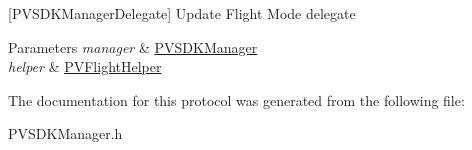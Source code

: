 \mbox{[}P\+V\+S\+D\+K\+Manager\+Delegate\mbox{]} Update Flight Mode delegate


\begin{DoxyParams}{Parameters}
{\em manager} & \hyperlink{interface_p_v_s_d_k_manager}{P\+V\+S\+D\+K\+Manager} \\
\hline
{\em helper} & \hyperlink{interface_p_v_flight_helper}{P\+V\+Flight\+Helper} \\
\hline
\end{DoxyParams}


The documentation for this protocol was generated from the following file\+:\begin{DoxyCompactItemize}
\item 
P\+V\+S\+D\+K\+Manager.\+h\end{DoxyCompactItemize}
